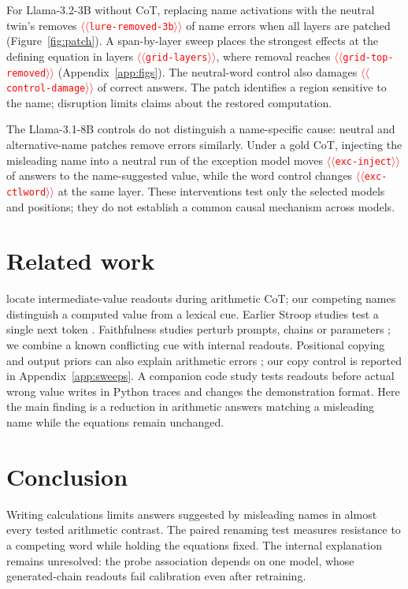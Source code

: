 \documentclass[11pt]{article}
\providecommand{\NUM}[1]{\textcolor{red}{$\langle\langle$\texttt{#1}$\rangle\rangle$}}
\begin{document}
For Llama-3.2-3B without CoT, replacing name activations with the neutral twin's removes
\NUM{lure-removed-3b} of name errors when all layers are patched (Figure~\ref{fig:patch}).
A span-by-layer sweep places the strongest effects at the
defining equation in layers \NUM{grid-layers}, where removal reaches \NUM{grid-top-removed}
(Appendix~\ref{app:figs}). The neutral-word control also damages \NUM{control-damage} of correct
answers. The patch identifies a region sensitive to the name; disruption limits claims about the restored computation.

The Llama-3.1-8B controls do not distinguish a name-specific cause: neutral and alternative-name
patches remove errors similarly. Under a gold CoT, injecting the misleading name into a neutral
run of the exception model moves \NUM{exc-inject} of answers to the name-suggested value, while the word control
changes \NUM{exc-ctlword} at the same layer. These interventions test only the selected models and positions; they do not establish a common causal mechanism across models.



\section{Related work}

\citet{kudo2026faithful} locate intermediate-value readouts during arithmetic CoT; our competing
names distinguish a computed value from a lexical cue. Earlier Stroop studies test a single next
token \cite{wang2026stroop,hu2026conflict}. Faithfulness studies perturb prompts, chains or
parameters \cite{turpin2023unfaithful,lanham2023measuring,chen2025reasoning,tutek2025unlearning};
we combine a known conflicting cue with internal readouts. Positional copying and output priors
can also explain arithmetic errors \cite{liu2026readout,prabhakar2024deciphering}; our copy
control is reported in Appendix~\ref{app:sweeps}.
A companion code study \citep{anon2026code} tests readouts before actual wrong value writes
in Python traces and changes the demonstration format. Here the main finding is a reduction
in arithmetic answers matching a misleading name while the equations remain unchanged.

\section{Conclusion}

Writing calculations limits answers suggested by misleading names in almost every tested
arithmetic contrast. The paired renaming test measures resistance to a competing word while
holding the equations fixed. The internal explanation remains unresolved: the probe
association depends on one model, whose generated-chain readouts fail calibration even
after retraining.
\end{document}
